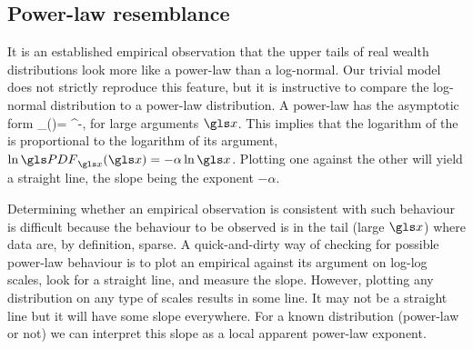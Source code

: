 \subsection{Power-law resemblance}
It is an established empirical observation \cite{Newman2005} that the upper tails of 
real wealth distributions look more like a power-law than a log-normal. Our trivial model does not
strictly reproduce this feature, but it is instructive to compare the log-normal distribution
to a power-law distribution. A power-law \PDFa has the asymptotic form 
\be
\PDF_\x(\x)= \x^{-\alpha},
\ee
for large arguments $\x$. This implies that the logarithm of the \PDFa is proportional 
to the logarithm of its argument, $\ln \PDF_\x(\x) = -\alpha \ln \x$. Plotting
one against the other will yield a straight line, the slope being the exponent $-\alpha$. 

Determining whether an empirical observation is consistent with such behaviour 
is difficult because the behaviour to be observed is in the tail (large $\x$) where data are,
by definition, sparse. A quick-and-dirty way of checking for possible power-law 
behaviour is to plot an empirical \PDFa against its argument on log-log scales, 
look for a straight line, and measure the slope. However, plotting any distribution on any 
type of scales results in some line. It may not be a straight line but it will have some slope 
everywhere. For a known distribution (power-law or not) we can interpret this slope 
as a local apparent power-law exponent. 

